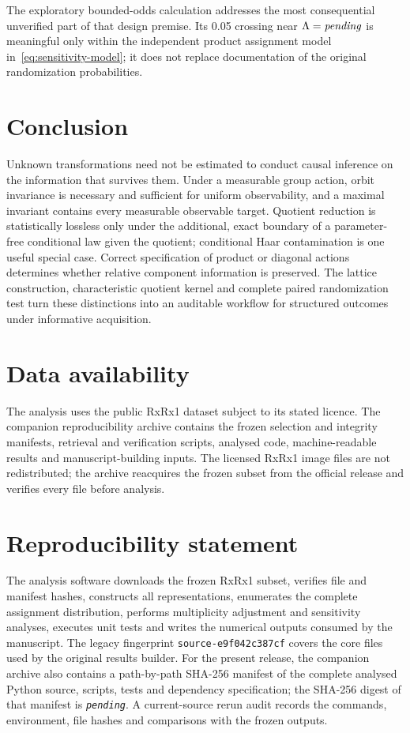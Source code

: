 \documentclass[11pt]{article}
\theoremstyle{plain}
\theoremstyle{definition}
\numberwithin{equation}{section}
\newcommand{\1}{\mathbf 1}
\newcommand{\pending}{\textnormal{\textit{pending}}}
\providecommand{\AnalysisSourceManifestHash}{\pending}
\providecommand{\RxSensitivityCritical}{\pending}
\begin{document}
The exploratory bounded-odds calculation addresses the most consequential
unverified part of that design premise. Its 0.05 crossing near
$\Lambda=\RxSensitivityCritical$ is meaningful only within the independent
product assignment model in~\eqref{eq:sensitivity-model}; it does not replace
documentation of the original randomization probabilities.

\section{Conclusion}\label{sec:conclusion}

Unknown transformations need not be estimated to conduct causal inference on the information that survives them. Under a measurable group action, orbit invariance is necessary and sufficient for uniform observability, and a maximal invariant contains every measurable observable target. Quotient reduction is statistically lossless only under the additional, exact boundary of a parameter-free conditional law given the quotient; conditional Haar contamination is one useful special case. Correct specification of product or diagonal actions determines whether relative component information is preserved. The lattice construction, characteristic quotient kernel and complete paired randomization test turn these distinctions into an auditable workflow for structured outcomes under informative acquisition.

\section*{Data availability}
The analysis uses the public RxRx1 dataset subject to its stated licence. The
companion reproducibility archive contains the frozen selection and integrity
manifests, retrieval and verification scripts, analysed code, machine-readable
results and manuscript-building inputs. The licensed RxRx1 image files are not
redistributed; the archive reacquires the frozen subset from the official
release and verifies every file before analysis.

\section*{Reproducibility statement}
The analysis software downloads the frozen RxRx1 subset, verifies file and
manifest hashes, constructs all representations, enumerates the complete
assignment distribution, performs multiplicity adjustment and sensitivity
analyses, executes unit tests and writes the numerical outputs consumed by the
manuscript. The legacy fingerprint
\texttt{source-\allowbreak e9f042c387cf} covers the core files used by the
original results builder. For the present release, the companion archive also
contains a path-by-path SHA-256 manifest of the complete analysed Python source,
scripts, tests and dependency specification; the SHA-256 digest of that manifest
is \texttt{\AnalysisSourceManifestHash}. A current-source rerun audit records
the commands, environment, file hashes and comparisons with the frozen outputs.
\end{document}
